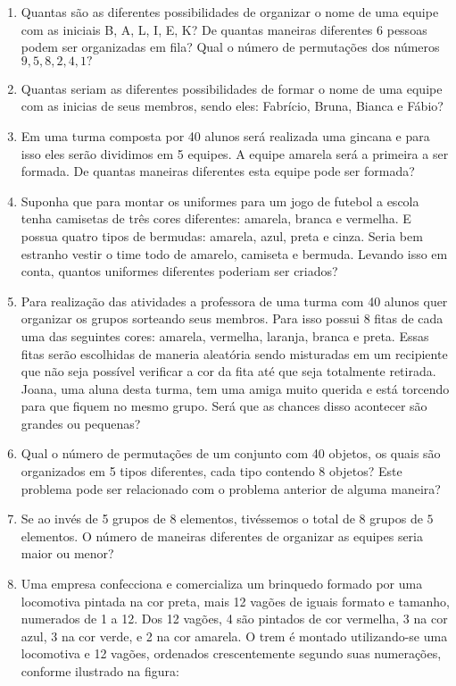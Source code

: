 \begin{enumerate}
\item  Quantas são as diferentes possibilidades de organizar o nome de uma equipe com as iniciais B, A, L, I, E, K? De quantas maneiras diferentes 6 pessoas podem ser organizadas em fila? Qual o número de permutações dos números $9, 5, 8, 2, 4, 1?$

\item Quantas seriam as diferentes possibilidades de formar o nome de uma equipe com as inicias de seus membros, sendo eles: Fabrício, Bruna, Bianca e Fábio? 

\item Em uma turma composta por 40 alunos será realizada uma gincana e para isso eles serão dividimos em 5 equipes. A equipe amarela será a primeira a ser formada. De quantas maneiras diferentes esta equipe pode ser formada?

\item Suponha que para montar os uniformes para um jogo de futebol a escola tenha camisetas de três cores diferentes: amarela, branca e vermelha. E possua quatro tipos de bermudas: amarela, azul, preta e cinza. Seria bem estranho vestir o time todo de amarelo, camiseta e bermuda. Levando isso em conta, quantos uniformes diferentes poderiam ser criados?

\item Para realização das atividades a professora de uma turma com 40 alunos quer organizar os grupos sorteando seus membros. Para isso possui 8 fitas de cada uma das seguintes cores: amarela, vermelha, laranja, branca e preta. Essas fitas serão escolhidas de maneria aleatória sendo misturadas em um recipiente que não seja possível verificar a cor da fita até que seja totalmente retirada.  Joana, uma aluna desta turma, tem uma amiga muito querida e está torcendo para que fiquem no mesmo grupo. Será que as chances disso acontecer são grandes ou pequenas?

\item Qual o número de permutações de um conjunto com 40 objetos, os quais são organizados em 5 tipos diferentes, cada tipo contendo 8 objetos? Este problema pode ser relacionado com o problema anterior de alguma maneira?

\item Se ao invés de 5 grupos de $8$ elementos, tivéssemos o total de 8 grupos de $5$ elementos. O número de maneiras diferentes de organizar as equipes seria maior ou menor? 

\item Uma empresa confecciona e comercializa um brinquedo formado por uma locomotiva pintada na cor preta, mais 12 vagões de iguais formato e tamanho, numerados de 1 a 12. Dos 12 vagões, 4 são pintados de cor vermelha, 3 na cor azul, 3 na cor verde, e 2 na cor amarela. O trem é montado utilizando-se uma locomotiva e 12 vagões, ordenados crescentemente segundo suas numerações, conforme ilustrado na figura: 


\end{enumerate}

